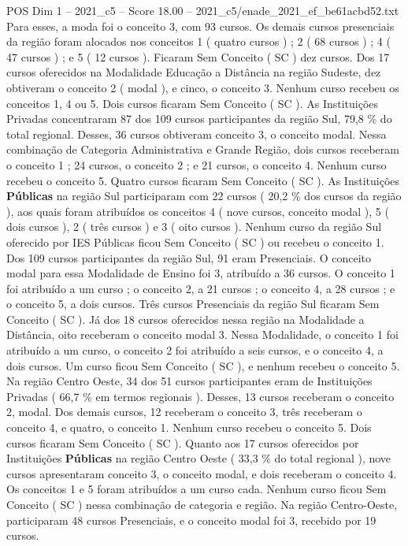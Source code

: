 \begin{textsample}{POS Dim 1 – 2021\_c5 – Score 18.00 – 2021\_c5/enade\_2021\_ef\_be61acbd52.txt}
Para esses, a moda foi o conceito 3, com 93 cursos.
Os demais cursos presenciais da região foram alocados nos conceitos 1 ( quatro cursos ) ; 2 ( 68 cursos ) ; 4 ( 47 cursos ) ; e 5 ( 12 cursos ).
Ficaram Sem Conceito ( SC ) dez cursos.
Dos 17 cursos oferecidos na Modalidade Educação a Distância na região Sudeste, dez obtiveram o conceito 2 ( modal ), e cinco, o conceito 3.
Nenhum curso recebeu os conceitos 1, 4 ou 5.
Dois cursos ficaram Sem Conceito ( SC ).
As Instituições Privadas concentraram 87 dos 109 cursos participantes da região Sul, 79,8 \% do total regional.
Desses, 36 cursos obtiveram conceito 3, o conceito modal.
Nessa combinação de Categoria Administrativa e Grande Região, dois cursos receberam o conceito 1 ; 24 cursos, o conceito 2 ; e 21 cursos, o conceito 4.
Nenhum curso recebeu o conceito 5.
Quatro cursos ficaram Sem Conceito ( SC ).
As Instituições \textbf{Públicas} na região Sul participaram com 22 cursos ( 20,2 \% dos cursos da região ), aos quais foram atribuídos os conceitos 4 ( nove cursos, conceito modal ), 5 ( dois cursos ), 2 ( três cursos ) e 3 ( oito cursos ).
Nenhum curso da região Sul oferecido por IES Públicas ficou Sem Conceito ( SC ) ou recebeu o conceito 1.
Dos 109 cursos participantes da região Sul, 91 eram Presenciais.
O conceito modal para essa Modalidade de Ensino foi 3, atribuído a 36 cursos.
O conceito 1 foi atribuído a um curso ; o conceito 2, a 21 cursos ; o conceito 4, a 28 cursos ; e o conceito 5, a dois cursos.
Três cursos Presenciais da região Sul ficaram Sem Conceito ( SC ).
Já dos 18 cursos oferecidos nessa região na Modalidade a Distância, oito receberam o conceito modal 3.
Nessa Modalidade, o conceito 1 foi atribuído a um curso, o conceito 2 foi atribuído a seis cursos, e o conceito 4, a dois cursos.
Um curso ficou Sem Conceito ( SC ), e nenhum recebeu o conceito 5.
Na região Centro Oeste, 34 dos 51 cursos participantes eram de Instituições Privadas ( 66,7 \% em termos regionais ).
Desses, 13 cursos receberam o conceito 2, modal.
Dos demais cursos, 12 receberam o conceito 3, três receberam o conceito 4, e quatro, o conceito 1.
Nenhum curso recebeu o conceito 5.
Dois cursos ficaram Sem Conceito ( SC ).
Quanto aos 17 cursos oferecidos por Instituições \textbf{Públicas} na região Centro Oeste ( 33,3 \% do total regional ), nove cursos apresentaram conceito 3, o conceito modal, e dois receberam o conceito 4.
Os conceitos 1 e 5 foram atribuídos a um curso cada.
Nenhum curso ficou Sem Conceito ( SC ) nessa combinação de categoria e região.
Na região Centro-Oeste, participaram 48 cursos Presenciais, e o conceito modal foi 3, recebido por 19 cursos.

\end{textsample}
